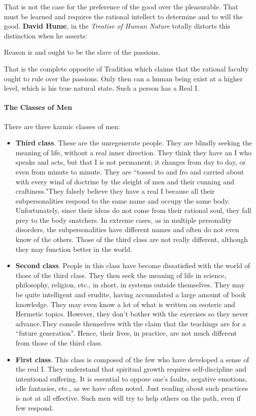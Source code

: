 That is not the case for the preference of the good over the pleasurable. That must be learned and requires the rational intellect to determine and to will the good. \textbf{David Hume}, in the \emph{Treatise of Human Nature} totally distorts this distinction when he asserts:

\begin{quotex}
Reason is and ought to be the slave of the passions.

\end{quotex}
That is the complete opposite of Tradition which claims that the rational faculty ought to rule over the passions. Only then can a human being exist at a higher level, which is his true natural state. Such a person has a Real I.

\paragraph{The Classes of Men}
There are three karmic classes of men:

\begin{itemize}
\item \textbf{Third class}. These are the unregenerate people. They are blindly seeking the meaning of life, without a real inner direction. They think they have an I who speaks and acts, but that I is not permanent; it changes from day to day, or even from minute to minute. They are ``tossed to and fro and carried about with every wind of doctrine by the sleight of men and their cunning and craftiness."They falsely believe they have a real I because all their subpersonalities respond to the same name and occupy the same body. Unfortunately, since their ideas do not come from their rational soul, they fall prey to the body snatchers. In extreme cases, as in multiple personality disorders, the subpersonalities have different names and often do not even know of the others. Those of the third class are not really different, although they may function better in the world. 
\item \textbf{Second class}. People in this class have become dissatisfied with the world of those of the third class. They then seek the meaning of life in science, philosophy, religion, etc., in short, in systems outside themselves. They may be quite intelligent and erudite, having accumulated a large amount of book knowledge. They may even know a lot of what is written on esoteric and Hermetic topics. However, they don't bother with the exercises so they never advance.They console themselves with the claim that the teachings are for a ``future generation". Hence, their lives, in practice, are not much different from those of the third class. 
\item \textbf{First class}. This class is composed of the few who have developed a sense of the real I. They understand that spiritual growth requires self-discipline and intentional suffering. It is essential to oppose one's faults, negative emotions, idle fantasies, etc., as we have often noted. Just reading about such practices is not at all effective. Such men will try to help others on the path, even if few respond. 
\end{itemize}

